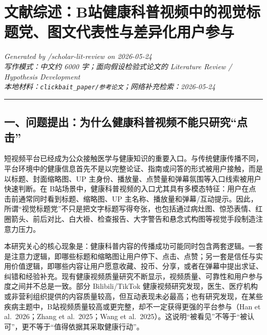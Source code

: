 \documentclass[
  12pt,
]{article}
\author{}
\date{}
\begin{document}
\section{文献综述：B站健康科普视频中的视觉标题党、图文代表性与差异化用户参与}\label{ux6587ux732eux7efcux8ff0bux7ad9ux5065ux5eb7ux79d1ux666eux89c6ux9891ux4e2dux7684ux89c6ux89c9ux6807ux9898ux515aux56feux6587ux4ee3ux8868ux6027ux4e0eux5deeux5f02ux5316ux7528ux6237ux53c2ux4e0e}

\emph{Generated by /scholar-lit-review on 2026-05-24}\\
\emph{写作模式：中文约 6000 字；面向假设检验式论文的 Literature Review /
Hypothesis Development}\\
\emph{本地材料：\texttt{clickbait\_paper/参考论文}；网络补充检索：2026-05-24}

\begin{center}\rule{0.5\linewidth}{0.5pt}\end{center}

\subsection{一、问题提出：为什么健康科普视频不能只研究``点击''}\label{ux4e00ux95eeux9898ux63d0ux51faux4e3aux4ec0ux4e48ux5065ux5eb7ux79d1ux666eux89c6ux9891ux4e0dux80fdux53eaux7814ux7a76ux70b9ux51fb}

短视频平台已经成为公众接触医学与健康知识的重要入口。与传统健康传播不同，平台环境中的健康信息首先不是以完整论证、指南或问答的形式被用户接触，而是以标题、封面缩略图、UP
主身份、播放量、点赞量和弹幕氛围等入口线索被用户快速判断。在
B站场景中，健康科普视频的入口尤其具有多模态特征：用户在点击前通常同时看到标题、缩略图、UP
主名称、播放量和弹幕/互动提示。因此，所谓``视觉标题党''不只是把文字标题写得夸张，也包括通过病灶图、惊恐表情、红圈箭头、前后对比、白大褂、检查报告、大字警告和悬念式构图等视觉手段制造注意力压力。

本研究关心的核心现象是：健康科普内容的传播成功可能同时包含两套逻辑。一套是注意力逻辑，即哪些标题和缩略图让用户停下、点击、点赞；另一套是信任与实用价值逻辑，即哪些内容让用户愿意收藏、投币、分享，或者在弹幕中提出求证、纠错和经验补充。现有健康视频质量研究不断显示，视频质量、可靠性和用户参与度之间并不总是一致。部分
Bilibili/TikTok
健康视频研究发现，医生、医疗机构或非营利组织提供的内容质量较高，但互动表现未必最高；也有研究发现，在某些疾病主题中，B站视频质量较高或更完整，却不一定获得更强的平台参与（Han
et al.~2026；Zhang et al.~2025；Wang et
al.~2025）。这说明``被看见''不等于``被认可''，更不等于``值得依据其采取健康行动''。
\end{document}
